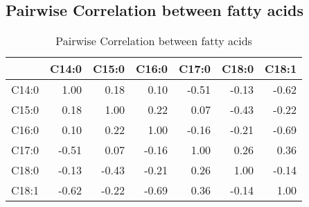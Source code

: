 \subsection*{Pairwise Correlation between fatty acids}
\begin{table}[H]
\centering
\begin{tabular}{rrrrrrr}
  \hline
 & C14:0 & C15:0 & C16:0 & C17:0 & C18:0 & C18:1 \\ 
  \hline
  C14:0 & 1.00 & 0.18 & 0.10 & -0.51 & -0.13 & -0.62 \\ 
  C15:0 & 0.18 & 1.00 & 0.22 & 0.07 & -0.43 & -0.22 \\ 
  C16:0 & 0.10 & 0.22 & 1.00 & -0.16 & -0.21 & -0.69 \\ 
  C17:0 & -0.51 & 0.07 & -0.16 & 1.00 & 0.26 & 0.36 \\ 
  C18:0 & -0.13 & -0.43 & -0.21 & 0.26 & 1.00 & -0.14 \\ 
  C18:1 & -0.62 & -0.22 & -0.69 & 0.36 & -0.14 & 1.00 \\ 
  \hline
\end{tabular}
\caption{Pairwise Correlation between fatty acids}
\label{tab:corr_acid}
\end{table}


